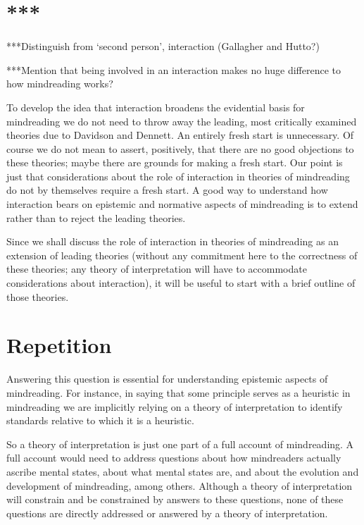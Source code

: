 \documentclass[12pt,letterpaper]{extarticle}
\begin{document}
\section{***}
***Distinguish from `second person', interaction (Gallagher and Hutto?)

***Mention that being involved in an interaction makes no huge difference to how mindreading works?


To develop the idea that 
interaction broadens the evidential basis for mindreading
we do not need to throw away the leading, most critically examined theories due to Davidson and Dennett.
An entirely fresh start is unnecessary.
Of course we do not mean to assert, positively, that there are no good objections to these theories; maybe there are grounds for making a fresh start.
Our point is just that considerations about the role of interaction in theories of mindreading do not by themselves require a fresh start.
A good way to understand how interaction bears on epistemic and normative aspects of mindreading is to extend rather than to reject the leading theories.

Since we shall discuss the role of interaction in theories of mindreading as an extension of leading theories (without any commitment here to the correctness of these theories; any theory of interpretation will have to accommodate considerations about interaction), it will be useful to start with a brief outline of those theories.





\section{Repetition}

Answering this question is essential for understanding epistemic aspects of mindreading.  
For instance, in saying that some principle serves as a heuristic in mindreading we are implicitly relying on a theory of interpretation to identify standards relative to which it is a heuristic.

So a theory of interpretation is just one part of a full account of mindreading.
A full account would need to address questions 
about how mindreaders actually ascribe mental states, 
about what mental states are, 
and 
about the evolution and development of mindreading,
among others.
Although a theory of interpretation will constrain and be constrained by answers to these questions,
none of these questions are directly addressed or answered by a theory of interpretation.
\end{document}
